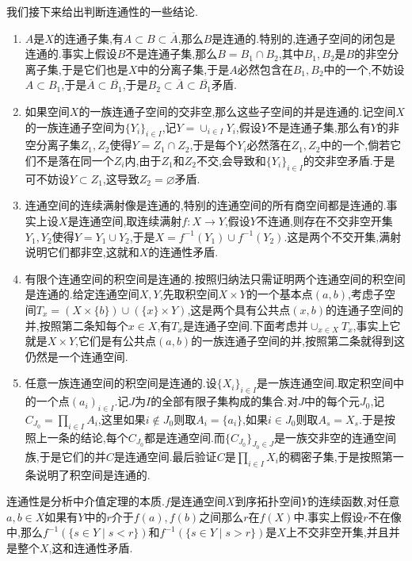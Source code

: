 我们接下来给出判断连通性的一些结论.
\begin{enumerate}
	\item $A$是$X$的连通子集,有$A\subset B\subset\overline{A}$,那么$B$是连通的.特别的,连通子空间的闭包是连通的.事实上假设$B$不是连通子集,那么$B=B_1\cap B_2$,其中$B_1,B_2$是$B$的非空分离子集,于是它们也是$X$中的分离子集,于是$A$必然包含在$B_1,B_2$中的一个,不妨设$A\subset B_1$,于是$\overline{A}\subset\overline{B_1}$,于是$B_2\subset\overline{A}\subset\overline{B_1}$矛盾.
	\item 如果空间$X$的一族连通子空间的交非空,那么这些子空间的并是连通的.记空间$X$的一族连通子空间为$\{Y_i\}_{i\in I}$,记$Y=\cup_{i\in I}Y_i$,假设$Y$不是连通子集,那么有$Y$的非空分离子集$Z_1,Z_2$使得$Y=Z_1\cap Z_2$,于是每个$Y_i$必然落在$Z_1,Z_2$中的一个,倘若它们不是落在同一个$Z_i$内,由于$Z_1$和$Z_2$不交,会导致和$\{Y_i\}_{i\in I}$的交非空矛盾.于是可不妨设$Y\subset Z_1$,这导致$Z_2=\varnothing$矛盾.
	\item 连通空间的连续满射像是连通的,特别的连通空间的所有商空间都是连通的.事实上设$X$是连通空间,取连续满射$f:X\to Y$,假设$Y$不连通,则存在不交非空开集$Y_1,Y_2$使得$Y=Y_1\cup Y_2$,于是$X=f^{-1}(Y_1)\cup f^{-1}(Y_2)$.这是两个不交开集,满射说明它们都非空,这就和$X$的连通性矛盾.
	\item 有限个连通空间的积空间是连通的.按照归纳法只需证明两个连通空间的积空间是连通的.给定连通空间$X,Y$,先取积空间$X\times Y$的一个基本点$(a,b)$,考虑子空间$T_x=(X\times\{b\})\cup(\{x\}\times Y)$,这是两个具有公共点$(x,b)$的连通子空间的并,按照第二条知每个$x\in X$,有$T_x$是连通子空间.下面考虑并$\cup_{x\in X}T_x$,事实上它就是$X\times Y$,它们是有公共点$(a,b)$的一族连通子空间的并,按照第二条就得到这仍然是一个连通空间.
	\item 任意一族连通空间的积空间是连通的.设$\{X_i\}_{i\in I}$是一族连通空间.取定积空间中的一个点$(a_i)_{i\in I}$.记$J$为$I$的全部有限子集构成的集合.对$J$中的每个元$J_0$,记$C_{J_0}=\prod_{i\in I}A_i$,这里如果$i\not\in J_0$则取$A_i=\{a_i\}$,如果$i\in J_0$则取$A_s=X_s$.于是按照上一条的结论,每个$C_{J_0}$都是连通空间.而$\{C_{J_0}\}_{J_0\in J}$是一族交非空的连通空间族,于是它们的并$C$是连通空间.最后验证$C$是$\prod_{i\in I}X_i$的稠密子集,于是按照第一条说明了积空间是连通的.
\end{enumerate}

连通性是分析中介值定理的本质.$f$是连通空间$X$到序拓扑空间$Y$的连续函数,对任意$a,b\in X$如果有$Y$中的$r$介于$f(a),f(b)$之间那么$r$在$f(X)$中.事实上假设$r$不在像中,那么$f^{-1}(\{s\in Y\mid s<r\})$和$f^{-1}(\{s\in Y\mid s>r\})$是$X$上不交非空开集,并且并是整个$X$,这和连通性矛盾.

